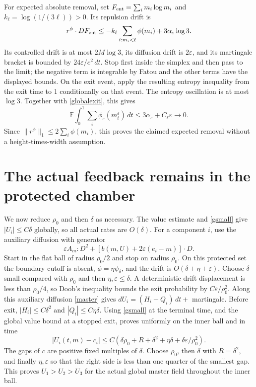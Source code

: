 \documentclass[11pt,a4paper]{article}
\newcommand{\E}{\mathbb E}
\newcommand{\dt}{\,dt}
\begin{document}
For expected absolute removal, set $F_{\rm ent}=\sum_i m_i\log m_i$
and $k_\ell=\log(1/(3\ell))>0$. Its repulsion drift is
\[
 r^\phi\cdot DF_{\rm ent}
 \leq-k_\ell\sum_{i:m_i<\ell}\phi(m_i)+3\alpha_\varepsilon\log3.
\]
Its controlled drift is at most $2M\log3$, its diffusion drift is
$2\varepsilon$, and its martingale bracket is bounded by
$24\varepsilon/e^2\dt$. Stop first inside the simplex and then pass
to the limit; the negative term is integrable by Fatou and the other
terms have the displayed bounds. On the exit event, apply the
resulting entropy inequality from the exit time to $1$ conditionally
on that event. The entropy oscillation is at most $\log3$.
Together with \eqref{globalexit}, this gives
\begin{equation}\label{impulse}
 \E\int_0^1\sum_i\phi_\varepsilon(m_i^\varepsilon)\dt
       \leq3\alpha_\varepsilon+C_\ell\varepsilon\longrightarrow0.
\end{equation}
Since $\|r^\phi\|_1\leq2\sum_i\phi(m_i)$, this proves the claimed
expected removal without a height-times-width assumption.

\section{The actual feedback remains in the protected chamber}
We now reduce $\rho_0$ and then $\delta$ as necessary.
The value estimate and \eqref{gsmall} give $|U_i|\leq C\delta$
globally, so all actual rates are $O(\delta)$.
For a component $i$, use the auxiliary diffusion with generator
\[
 \varepsilon A_m:D^2+[b(m,U)+2\varepsilon(e_i-m)]\cdot D.
\]
Start in the flat ball of radius $\rho_0/2$ and stop on radius
$\rho_0$. On this protected set the boundary cutoff is absent,
$\phi=\eta\psi_\delta$, and the drift is $O(\delta+\eta+\varepsilon)$.
Choose $\delta$ small compared with $\rho_0$ and then
$\eta,\varepsilon\leq\delta$. A deterministic drift displacement is
less than $\rho_0/4$, so Doob's inequality bounds the exit probability
by $C\varepsilon/\rho_0^2$.
Along this auxiliary diffusion \eqref{master} gives
$dU_i=(H_i-Q_i)\dt+$ martingale. Before exit,
$|H_i|\leq C\delta^2$ and $|Q_i|\leq C\eta\delta$.
Using \eqref{gsmall} at the terminal time, and the global value bound
at a stopped exit, proves uniformly on the inner ball and in time
\begin{equation}\label{chamberestimate}
 |U_i(t,m)-c_i|
 \leq C(\delta\rho_0+R+\delta^2+\eta\delta
                         +\delta\varepsilon/\rho_0^2).
\end{equation}
The gaps of $c$ are positive fixed multiples of $\delta$.
Choose $\rho_0$, then $\delta$ with $R=\delta^2$, and finally
$\eta,\varepsilon$ so that the right side is less than one quarter
of the smallest gap. This proves $U_1>U_2>U_3$ for the actual
global master field throughout the inner ball.
\end{document}
